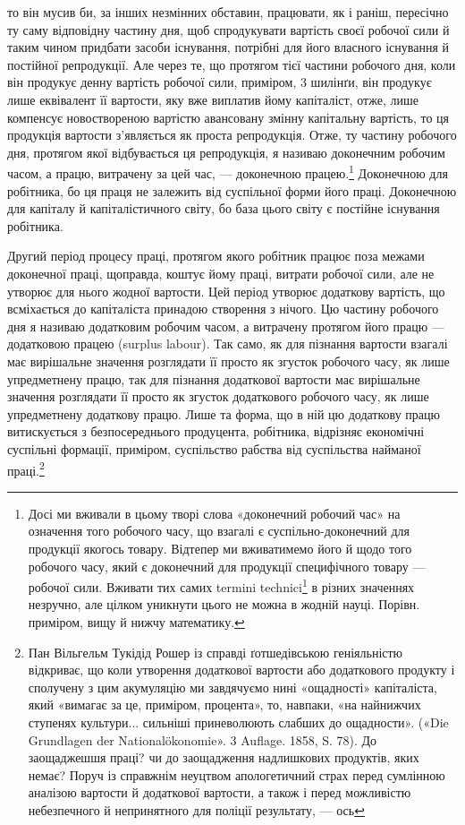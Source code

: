 то він мусив би, за інших незмінних обставин, працювати, як і раніш, пересічно ту саму відповідну
частину дня, щоб спродукувати вартість своєї робочої сили й таким чином придбати засоби існування,
потрібні для його власного існування й постійної репродукції. Але через те, що протягом тієї частини
робочого дня,
коли він продукує денну вартість робочої сили, приміром, 3 шилінґи, він продукує лише еквівалент її
вартости, яку вже виплатив йому капіталіст, отже, лише компенсує новоствореною вартістю
авансовану змінну капітальну вартість, то ця продукція вартости з’являється як проста репродукція.
Отже, ту частину
робочого дня, протягом якої відбувається ця репродукція, я називаю доконечним робочим часом, а
працю, витрачену
за цей час, — доконечною працею.\footnote{
Досі ми вживали в цьому творі слова «доконечний робочий час» на означення того робочого часу, що
взагалі є суспільно-доконечний для продукції якогось товару. Відтепер ми вживатимемо його й щодо
того
робочого часу, який є доконечний для продукції специфічного товару — робочої сили. Вживати тих самих
termini technici\footnote*{
— технічних термінів. Ред.
} в різних значеннях незручно, але цілком уникнути цього не можна в жодній науці.
Порівн. приміром, вищу й нижчу математику.
} Доконечною для робітника, бо ця праця не залежить від суспільної
форми його праці.
Доконечною для капіталу й капіталістичного світу, бо база цього
світу є постійне існування робітника.

Другий період процесу праці, протягом якого робітник працює поза межами доконечної праці, щоправда,
коштує йому
праці, витрати робочої сили, але не утворює для нього жодної вартости. Цей період утворює додаткову
вартість, що всміхається до капіталіста принадою створення з нічого. Цю частину робочого
дня я називаю додатковим робочим часом, а витрачену протягом його працю — додатковою працею (surplus
labour). Так само, як для пізнання вартости взагалі має вирішальне значення розглядати її просто як
згусток робочого часу, як лише упредметнену працю, так для пізнання додаткової вартости має
вирішальне
значення розглядати її просто як згусток додаткового робочого часу, як лише упредметнену додаткову
працю. Лише та форма, що в ній цю додаткову працю витискується з безпосереднього продуцента,
робітника, відрізняє економічні суспільні формації, приміром, суспільство рабства від суспільства
найманої праці.\footnote{
Пан Вільгельм Тукідід Рошер із справді ґотшедівською геніяльністю відкриває, що коли утворення
додаткової вартости або додаткового продукту і сполучену з цим акумуляцію ми завдячуємо нині
«ощадності» капіталіста, який «вимагає за це, приміром, процента», то, навпаки, «на
найнижчих ступенях культури... сильніші приневолюють слабших до ощадности». («Die Grundlagen der
Nationalökonomie». 3 Auflage. 1858, S. 78). До заощаджешшя праці? чи до заощадження надлишкових
продуктів, яких немає? Поруч із справжнім неуцтвом апологетичний страх перед сумлінною аналізою
вартости й додаткової вартости, а також і перед можливістю небезпечного й непринятного для поліції
результату, — ось
}